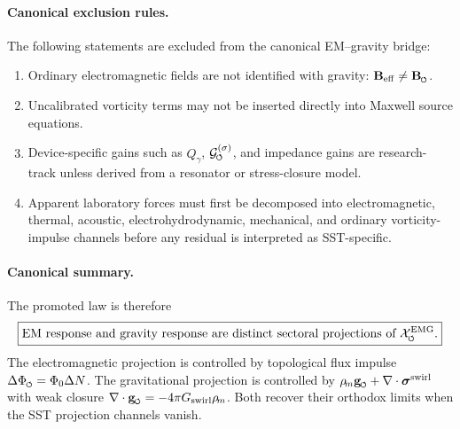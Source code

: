 \documentclass[11pt]{article}
\theoremstyle{definition}
\theoremstyle{plain}
\theoremstyle{remark}
\newcommand{\swirlarrow}{\mathchoice{\mkern-2mu\scriptstyle\boldsymbol{\circlearrowleft}}{\mkern-2mu\scriptstyle\boldsymbol{\circlearrowleft}}{\mkern-2mu\scriptscriptstyle\boldsymbol{\circlearrowleft}}{\mkern-2mu\scriptscriptstyle\boldsymbol{\circlearrowleft}}}
\newcommand{\rhoM}{\rho_{\!m}}
\begin{document}
        \paragraph{Canonical exclusion rules.}
        The following statements are excluded from the canonical EM--gravity bridge:
        \begin{enumerate}
            \item Ordinary electromagnetic fields are not identified with gravity: \(\mathbf{B}_{\mathrm{eff}}\neq\mathbf{B}_{\swirlarrow}\).
            \item Uncalibrated vorticity terms may not be inserted directly into Maxwell source equations.
            \item Device-specific gains such as \(Q_\gamma\), \(\mathcal{G}^{(\sigma)}_{\swirlarrow}\), and impedance gains are research-track unless derived from a resonator or stress-closure model.
            \item Apparent laboratory forces must first be decomposed into electromagnetic, thermal, acoustic, electrohydrodynamic, mechanical, and ordinary vorticity-impulse channels before any residual is interpreted as SST-specific.
        \end{enumerate}

        \paragraph{Canonical summary.}
        The promoted law is therefore
        \begin{align}
            \boxed{
            \text{EM response and gravity response are distinct sectoral projections of }\mathcal{X}^{\mathrm{EMG}}_{\swirlarrow}.
            }
            \label{eq:canonical_emg_summary_law}
        \end{align}
        The electromagnetic projection is controlled by topological flux impulse \(\Delta\Phi_{\swirlarrow}=\Phi_0\Delta N\). The gravitational projection is controlled by \(\rhoM\mathbf{g}_{\swirlarrow}+\nabla\cdot\boldsymbol{\sigma}^{\mathrm{swirl}}\) with weak closure \(\nabla\cdot\mathbf{g}_{\swirlarrow}=-4\pi G_{\mathrm{swirl}}\rhoM\). Both recover their orthodox limits when the SST projection channels vanish.



        
\end{document}
